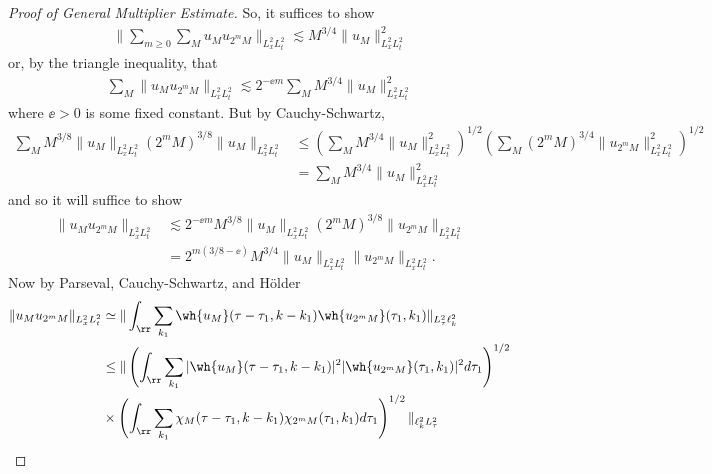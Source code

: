 \begin{proof}[Proof of General Multiplier Estimate]
  So, it suffices to show
%
%
\begin{equation*}
\begin{split}
  \| \sum_{m \ge 0} \sum_{M} u_{M} u_{2^{m}M} \|_{L^{2}_{x}L^{2}_{t}}
  \lesssim M^{3/4} \| u_{M} \|_{L^{2}_{x}L^{2}_{t}}^{2}
\end{split}
\end{equation*}
%
%
or, by the triangle inequality, that
%
%
\begin{equation*}
\begin{split}
  \sum_{M} \| u_{M} u_{2^{m}M} \|_{L^{2}_{x}L^{2}_{t}}
\lesssim 2^{-\ee m} \sum_{M} M^{3/4} \| u_{M} \|_{L^{2}_{x}L^{2}_{t}}^{2}
\end{split}
\end{equation*}
where $\ee > 0$ is some fixed constant.
But by Cauchy-Schwartz,
%
%
\begin{equation*}
\begin{split}
  \sum_{M} M^{3/8} \| u_{M} \|_{L^{2}_{x}L^{2}_{t}} (2^{m}M)^{3/8} \| u_{M} \|_{L^{2}_{x}L^{2}_{t}} 
  & \le (\sum_{M} M^{3/4} \| u_{M} \|_{L^{2}_{x}L^{2}_{t}}^{2})^{1/2}
  (\sum_{M} (2^{m}M)^{3/4} \| u_{2^{m}M} \|_{L^{2}_{x}L^{2}_{t}}^{2})^{1/2}
  \\
  & = \sum_{M} M^{3/4} \| u_{M} \|_{L^{2}_{x}L^{2}_{t}}^{2}
\end{split}
\end{equation*}
%
%
and so it will suffice to show
\begin{equation*}
\begin{split}
\| u_{M} u_{2^{m}M} \|_{L^{2}_{x}L^{2}_{t}}
& \lesssim 2^{-\ee m} M^{3/8} \| u_{M} \|_{L^{2}_{x}L^{2}_{t}}
(2^{m} M)^{3/8} \| u_{2^{m} M} \|_{L^{2}_{x}L^{2}_{t}}
\\
& = 2^{m(3/8 - \ee)} M^{3/4} \| u_{M} \|_{L^{2}_{x}L^{2}_{t}}
\| u_{2^{m} M} \|_{L^{2}_{x}L^{2}_{t}}.
\end{split}
\end{equation*}
%
Now by Parseval, Cauchy-Schwartz, and H\"older
%
%
\begin{equation*}
\begin{split}
\| u_{M} u_{2^{m}M} \|_{L^{2}_{x}L^{2}_{t}}
& \simeq \| \int_{\rr} \sum_{k_{1}} \wh{u_{M}}(\tau - \tau_{1}, k - k_{1}) \wh{u_{2^{m}M}}(\tau_{1}, k_{1}) \|_{L^{2}_{\tau} \ell^{2}_{k}}
\\
& \le \| \left( \int_{\rr} \sum_{k_{1}} | \wh{u_{M}}(\tau - \tau_{1}, k - k_{1}) |^{2} | \wh{u_{2^{m}M}}(\tau_{1}, k_{1}) |^{2} d \tau_{1} \right)^{1/2} 
\\
& \times \left ( \int_{\rr} \sum_{k_{1}} \chi_{M}(\tau - \tau_{1}, k - k_{1}) \chi_{2^{m}M}(\tau_{1}, k_{1}) d \tau_{1} \right ) ^{1/2} \|_{\ell^{2}_{k} L^{2}_{\tau}}

\end{split}
\end{equation*}
\end{proof}
